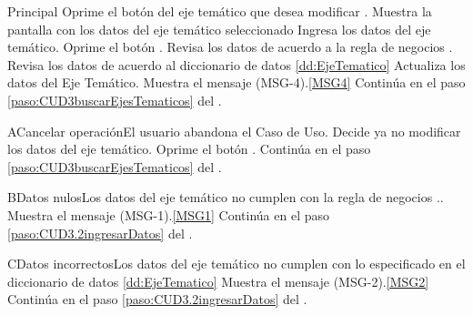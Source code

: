 	\begin{UCtrayectoria}{Principal}
			\UCpaso[\UCactor] Oprime el botón  del eje temático que desea modificar 
			.
			\UCpaso Muestra la pantalla  con los datos del eje temático seleccionado 
			\UCpaso [\UCactor] Ingresa los datos del eje temático.\label{paso:CUD3.2ingresarDatos}
			\UCpaso [\UCactor] Oprime el botón .
			\UCpaso Revisa los datos de acuerdo a la regla de negocios . 
			\UCpaso	Revisa los datos de acuerdo al diccionario de datos \ref{dd:EjeTematico} 
			\UCpaso Actualiza los datos del Eje Temático.
			\UCpaso Muestra el mensaje (MSG-4).\ref{MSG4}
			\UCpaso Continúa en el paso \ref{paso:CUD3buscarEjesTematicos} del .
	\end{UCtrayectoria}
	\newpage
		\begin{UCtrayectoriaA}{A}{Cancelar operación}{El usuario abandona el Caso de Uso.}
			\UCpaso[\UCactor] Decide ya no modificar los datos del eje temático.
			\UCpaso[\UCactor] Oprime el botón .
			\UCpaso Continúa en el paso \ref{paso:CUD3buscarEjesTematicos} del .
		\end{UCtrayectoriaA}
		
		 \begin{UCtrayectoriaA}{B}{Datos nulos}{Los datos del eje temático no cumplen con la regla de negocios ..}
			\UCpaso Muestra el mensaje (MSG-1).\ref{MSG1}
			\UCpaso Continúa en el paso \ref{paso:CUD3.2ingresarDatos} del .
		\end{UCtrayectoriaA}

		 \begin{UCtrayectoriaA}{C}{Datos incorrectos}{Los datos del eje temático no cumplen con lo especificado en el diccionario de datos \ref{dd:EjeTematico}}
			\UCpaso Muestra el mensaje (MSG-2).\ref{MSG2}
			\UCpaso Continúa en el paso \ref{paso:CUD3.2ingresarDatos} del .
		\end{UCtrayectoriaA}

